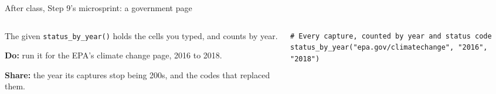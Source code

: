 \documentclass[9pt,aspectratio=169]{beamer}
\begin{document}
\begin{frame}[fragile]{After class, Step 9's microsprint: a government page}
    \begin{columns}[T]
        \begin{column}{0.37\textwidth}
            The given \texttt{status\_by\_year()} holds the cells you typed, and counts by year.

            \medskip
            \textbf{Do:} run it for the EPA's climate change page, 2016 to 2018.

            \medskip
            \textbf{Share:} the year its captures stop being 200s, and the codes that replaced them.
        \end{column}
        \begin{column}{0.6\textwidth}
\begin{lstlisting}
# Every capture, counted by year and status code
status_by_year("epa.gov/climatechange", "2016", "2018")
\end{lstlisting}
        \end{column}
    \end{columns}
\end{frame}
\end{document}
